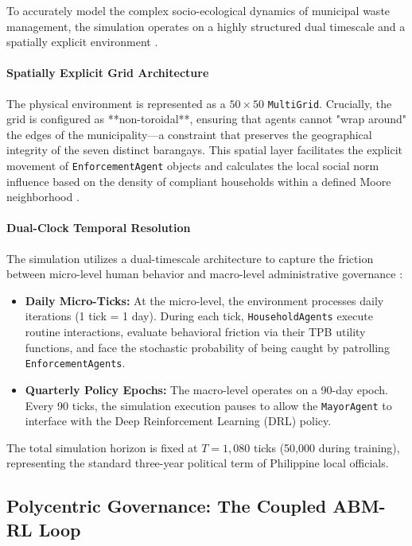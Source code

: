 To accurately model the complex socio-ecological dynamics of municipal waste management, the simulation operates on a highly structured dual timescale and a spatially explicit environment \citep{Brugiere2022}.

\paragraph{Spatially Explicit Grid Architecture}
The physical environment is represented as a $50 \times 50$ \texttt{MultiGrid}. Crucially, the grid is configured as **non-toroidal**, ensuring that agents cannot "wrap around" the edges of the municipality—a constraint that preserves the geographical integrity of the seven distinct barangays. This spatial layer facilitates the explicit movement of \texttt{EnforcementAgent} objects and calculates the local social norm influence based on the density of compliant households within a defined Moore neighborhood \citep{TianReview2024}.

\paragraph{Dual-Clock Temporal Resolution}
The simulation utilizes a dual-timescale architecture to capture the friction between micro-level human behavior and macro-level administrative governance \citep{Akbarpour2021}:
\begin{itemize}
    \item \textbf{Daily Micro-Ticks:} At the micro-level, the environment processes daily iterations (1 tick = 1 day). During each tick, \texttt{HouseholdAgents} execute routine interactions, evaluate behavioral friction via their TPB utility functions, and face the stochastic probability of being caught by patrolling \texttt{EnforcementAgents}.
    \item \textbf{Quarterly Policy Epochs:} The macro-level operates on a 90-day epoch. Every 90 ticks, the simulation execution pauses to allow the \texttt{MayorAgent} to interface with the Deep Reinforcement Learning (DRL) policy.
\end{itemize}
The total simulation horizon is fixed at $T = 1,080$ ticks (50,000 during training), representing the standard three-year political term of Philippine local officials.

\subsection{Polycentric Governance: The Coupled ABM-RL Loop}

